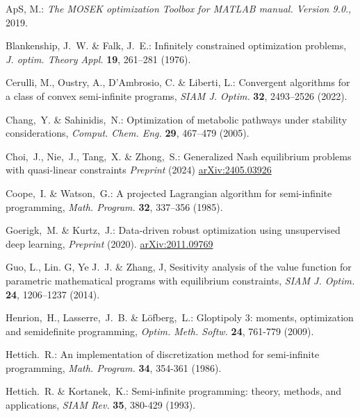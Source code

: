 \documentclass{amsart}
\theoremstyle{plain}
\numberwithin{equation}{section}
\begin{document}
		\begin{thebibliography}{100}
			
			ApS, M.:
			{\em The MOSEK optimization Toolbox for MATLAB manual. Version
				9.0.}, 2019.
			
			Blankenship, J.~W. \& Falk, J.~E.:
			Infinitely constrained optimization problems,
			{\em J. optim. Theory Appl.} \textbf{19}, 261--281 (1976).

			
			Cerulli, M., Oustry, A., D'Ambrosio, C. \& Liberti, L.:
			Convergent algorithms for a class of convex semi-infinite programs,
			{\em SIAM J. Optim.} \textbf{32}, 2493--2526 (2022).
			
			Chang,~Y. \& Sahinidis,~N.: 
			Optimization of metabolic pathways under stability considerations,
			{\em Comput. Chem. Eng.} \textbf{29}, 467--479 (2005).
			
			Choi,~J., Nie,~J., Tang,~X. \& Zhong,~S.:
			Generalized Nash equilibrium problems with quasi-linear constraints
			{\em Preprint} (2024) \url{arXiv:2405.03926}
			
			Coope,~I. \&  Watson,~G.: 
			A projected Lagrangian algorithm for semi-infinite programming,
			{\em Math. Program.} \textbf{32}, 337--356 (1985).
			
			
			Goerigk,~M. \& Kurtz,~J.: 
			Data-driven robust optimization using unsupervised deep learning,
			{\em Preprint} (2020). \url{arXiv:2011.09769}
			
			Guo, L., Lin. G, Ye J.~J. \& Zhang, J,
			Sesitivity analysis of the value function for parametric mathematical programs with equilibrium constraints,
			{\em SIAM J. Optim.} \textbf{24}, 1206--1237 (2014). 
			
			Henrion,~H., Lasserre,~J.~B. \& L\"{o}fberg,~L.:
			Gloptipoly 3: moments, optimization and semidefinite programming,
			\emph{Optim. Meth. Softw.} \textbf{24}, 761-779  (2009).
			
			Hettich.~R.:
			An implementation of discretization method for semi-infinite programming,
			\emph{Math. Program.} \textbf{34}, 354-361 (1986).
			
			Hettich.~R. \& Kortanek,~K.:
			Semi-infinite programming: theory, methods, and applications,
			\emph{SIAM Rev.} \textbf{35}, 380-429 (1993).
			

\end{thebibliography}
\end{document}
